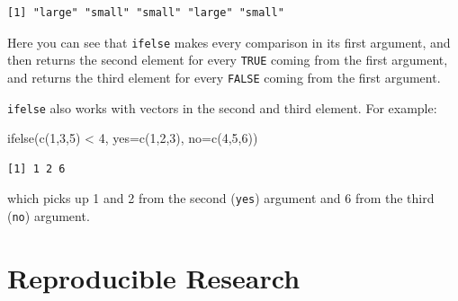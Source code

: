 \documentclass[
  letterpaper,
  DIV=11,
  numbers=noendperiod]{scrreprt}
\newenvironment{Shaded}{\begin{snugshade}}{\end{snugshade}}
\newcommand{\AttributeTok}[1]{\textcolor[rgb]{0.40,0.45,0.13}{#1}}
\newcommand{\ControlFlowTok}[1]{\textcolor[rgb]{0.00,0.23,0.31}{\textbf{#1}}}
\newcommand{\DecValTok}[1]{\textcolor[rgb]{0.68,0.00,0.00}{#1}}
\newcommand{\FunctionTok}[1]{\textcolor[rgb]{0.28,0.35,0.67}{#1}}
\newcommand{\NormalTok}[1]{\textcolor[rgb]{0.00,0.23,0.31}{#1}}
\newcommand{\OtherTok}[1]{\textcolor[rgb]{0.00,0.23,0.31}{#1}}
\newcommand{\SpecialCharTok}[1]{\textcolor[rgb]{0.37,0.37,0.37}{#1}}
\newcommand{\StringTok}[1]{\textcolor[rgb]{0.13,0.47,0.30}{#1}}
\begin{document}
\begin{Shaded}
\end{Shaded}

\begin{verbatim}
[1] "large" "small" "small" "large" "small"
\end{verbatim}

Here you can see that \texttt{ifelse} makes every comparison in its
first argument, and then returns the second element for every
\texttt{TRUE} coming from the first argument, and returns the third
element for every \texttt{FALSE} coming from the first argument.

\texttt{ifelse} also works with vectors in the second and third element.
For example:

\begin{Shaded}
\begin{Highlighting}[]
  \FunctionTok{ifelse}\NormalTok{(}\FunctionTok{c}\NormalTok{(}\DecValTok{1}\NormalTok{,}\DecValTok{3}\NormalTok{,}\DecValTok{5}\NormalTok{) }\SpecialCharTok{\textless{}} \DecValTok{4}\NormalTok{, }\AttributeTok{yes=}\FunctionTok{c}\NormalTok{(}\DecValTok{1}\NormalTok{,}\DecValTok{2}\NormalTok{,}\DecValTok{3}\NormalTok{), }\AttributeTok{no=}\FunctionTok{c}\NormalTok{(}\DecValTok{4}\NormalTok{,}\DecValTok{5}\NormalTok{,}\DecValTok{6}\NormalTok{))}
\end{Highlighting}
\end{Shaded}

\begin{verbatim}
[1] 1 2 6
\end{verbatim}

which picks up 1 and 2 from the second (\texttt{yes}) argument and 6
from the third (\texttt{no}) argument.

\section{Reproducible Research}\label{reproducible-research}
\end{document}
